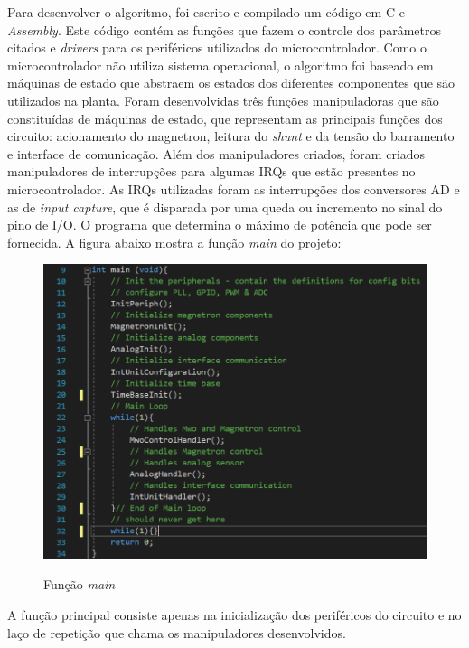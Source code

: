 Para desenvolver o algoritmo, foi escrito e compilado um código em C e \textit{Assembly}. Este código contém as funções que fazem o controle dos parâmetros citados e \textit{drivers} para os periféricos utilizados do microcontrolador. Como o microcontrolador não utiliza sistema operacional, o algoritmo foi baseado em máquinas de estado que abstraem os estados dos diferentes componentes que são utilizados na planta. Foram desenvolvidas três funções manipuladoras que são constituídas de máquinas de estado, que representam as principais funções dos circuito: acionamento do magnetron, leitura do \textit{shunt} e da tensão do barramento e interface de comunicação. Além dos manipuladores criados, foram criados manipuladores de interrupções para algumas IRQs que estão presentes no microcontrolador. As IRQs utilizadas foram as interrupções dos conversores AD e as de \textit{input capture}, que é disparada por uma queda ou incremento no sinal do pino de I/O. O programa que determina o máximo de potência que pode ser fornecida. A figura abaixo mostra a função \textit{main} do projeto:

\begin{figure}[H]
    \centering
    \caption{Função \textit{main}}
    \includegraphics[width=1\textwidth]{./dados/figuras/func_main}
    \label{fig:figura-func-main}
\end{figure}

A função principal consiste apenas na inicialização dos periféricos do circuito e no laço de repetição que chama os manipuladores desenvolvidos.

